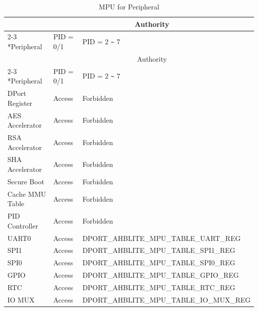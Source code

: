 \begin{longtable}[c]{|p{4cm}|p{2cm}|p{9cm}|}
    
    \caption{MPU for Peripheral}
    \label{table:MPU_for_Peripheral}
    \\\hline
    \rowcolor{lightgray}
    & \multicolumn{2}{c|}{Authority} \\
    \cline{2-3}
    \rowcolor{lightgray}
    \multirow{-2}*{Peripheral} & PID = 0/1 & PID = 2 \verb+~+ 7 \\
    \hline
    \endfirsthead
    
    \hline
    \rowcolor{lightgray}
    & \multicolumn{2}{c|}{Authority} \\
    \cline{2-3}
    \rowcolor{lightgray}
    \multirow{-2}*{Peripheral} & PID = 0/1 & PID = 2 \verb+~+ 7 \\
    \hline
    \endhead

    \endfoot
    
    \hline
    \endlastfoot
    
    DPort Register        & Access & Forbidden \\
    \hline
    AES Accelerator       & Access & Forbidden \\
    \hline
    RSA Accelerator       & Access & Forbidden \\
    \hline
    SHA Accelerator       & Access & Forbidden \\
    \hline
    Secure Boot           & Access & Forbidden \\
    \hline
    
    
    Cache MMU Table       & Access & Forbidden \\
    \hline
    PID Controller        & Access & Forbidden \\
    \hline
    UART0                 & Access & DPORT\_AHBLITE\_MPU\_TABLE\_UART\_REG \\
    \hline
    SPI1                  & Access & DPORT\_AHBLITE\_MPU\_TABLE\_SPI1\_REG \\
    \hline
    SPI0                  & Access & DPORT\_AHBLITE\_MPU\_TABLE\_SPI0\_REG \\
    \hline
    GPIO                  & Access & DPORT\_AHBLITE\_MPU\_TABLE\_GPIO\_REG \\
    \hline
    
    
    RTC                   & Access & DPORT\_AHBLITE\_MPU\_TABLE\_RTC\_REG \\
    \hline
    IO MUX                & Access & DPORT\_AHBLITE\_MPU\_TABLE\_IO\_MUX\_REG \\
    \hline
    

\end{longtable}
